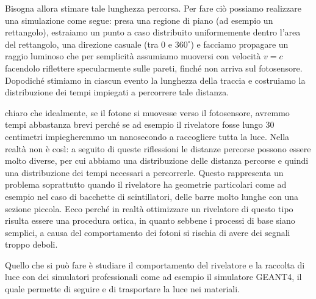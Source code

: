 Bisogna allora stimare tale lunghezza percorsa. Per fare ciò possiamo realizzare una simulazione come segue: presa una regione di piano (ad esempio un rettangolo), estraiamo un punto a caso distribuito uniformemente dentro l'area del rettangolo, una direzione casuale (tra $0$ e $360^{\circ}$) e facciamo propagare un raggio luminoso che per semplicità assumiamo muoversi con velocità $v=c$ facendolo riflettere specularmente sulle pareti, finché non arriva sul fotosensore. Dopodiché stimiamo in ciascun evento la lunghezza della traccia e costruiamo la distribuzione dei tempi impiegati a percorrere tale distanza. 

\begin{figure}[H]
   \centering
\end{figure}

\E chiaro che idealmente, se il fotone si muovesse verso il fotosensore, avremmo tempi abbastanza brevi perché se ad esempio il rivelatore fosse lungo 30 centimetri impiegheremmo un nanosecondo a raccogliere tutta la luce. Nella realtà non è così: a seguito di queste riflessioni le distanze percorse possono essere molto diverse, per cui abbiamo una distribuzione delle distanza percorse e quindi una distribuzione dei tempi necessari a percorrerle. Questo rappresenta un problema soprattutto quando il rivelatore ha geometrie particolari come ad esempio nel caso di bacchette di scintillatori, delle barre molto lunghe con una sezione piccola. Ecco perché in realtà ottimizzare un rivelatore di questo tipo risulta essere una procedura ostica, in quanto sebbene i processi di base siano semplici, a causa del comportamento dei fotoni si rischia di avere dei segnali troppo deboli.


Quello che si può fare è studiare il comportamento del rivelatore e la raccolta di luce con dei simulatori professionali come ad esempio il simulatore GEANT4, il quale permette di seguire e di trasportare la luce nei materiali. 

